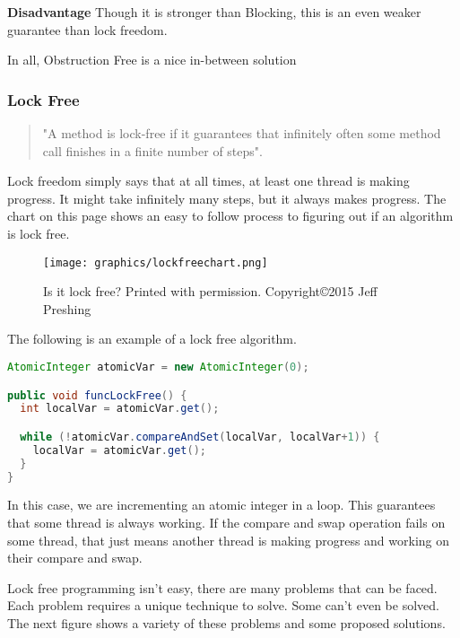 \documentclass[letterpaper, 12pt]{article}
\begin{document}
{\bfseries Disadvantage}\newline
Though it is stronger than Blocking, this is an even weaker guarantee than lock freedom.

\par\vspace{\baselineskip}
In all, Obstruction Free is a nice in-between solution

\subsubsection{Lock Free}
\begin{quotation}
	"A method is lock-free if it guarantees that infinitely often some method call finishes 
	in a finite number of steps"\citep[p. 60]{artofmulti}.
\end{quotation}

Lock freedom simply says that at all times, at least one thread is making progress. It might 
take infinitely many steps, but it always makes progress. The chart on this page shows 
an easy to follow process to figuring out if an algorithm is lock free. 

\begin{figure}
    \centering
	\texttt{[image: graphics/lockfreechart.png]}
    \caption{Is it lock free? Printed with permission. Copyright\copyright 2015 Jeff Preshing}
    \citep{introlockfree}
\end{figure}

The following is an example of a lock free algorithm.
\citep{concurrencyfreaks}
\begin{lstlisting}[language=Java]
AtomicInteger atomicVar = new AtomicInteger(0);

public void funcLockFree() {
  int localVar = atomicVar.get();

  while (!atomicVar.compareAndSet(localVar, localVar+1)) {
    localVar = atomicVar.get();
  }
}
\end{lstlisting} 
In this case, we are incrementing an atomic integer in a loop. This guarantees that 
some thread is always working. If the compare and swap operation fails on some thread, 
that just means another thread is making progress and working on their compare and swap.

Lock free programming isn't easy, there are many problems that can be faced. Each 
problem requires a unique technique to solve. Some can't even be solved. The next 
figure shows a variety of these problems and some proposed solutions.
\end{document}
